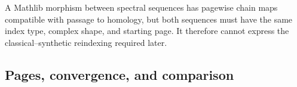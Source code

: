 \begin{definition}
  \label{def:mathlib-spectral-sequence-hom}
  \mathlibok
  A Mathlib morphism between spectral sequences has pagewise chain maps
  compatible with passage to homology, but both sequences must have the same
  index type, complex shape, and starting page.  It therefore cannot express
  the classical--synthetic reindexing required later.
\end{definition}

\subsection{Pages, convergence, and comparison}







